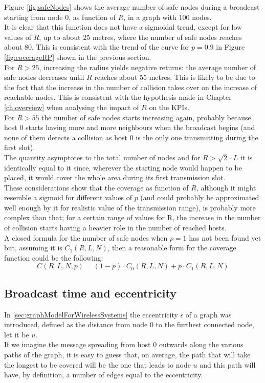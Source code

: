\hfill \break
Figure \ref{fig:safeNodes} shows the average number of safe nodes during a broadcast starting from node 0, as function of $R$, in a graph with 100 nodes.\\
It is clear that this function does not have a sigmoidal trend, except for low values of $R$, up to about 25 metres, where the number of safe nodes reaches about 80. This is consistent with the trend of the curve for $p=0.9$ in Figure \ref{fig:coverageRP} shown in the previous section.\\
For $R > 25$, increasing the radius yields negative returns: the average number of safe nodes decreases until $R$ reaches about 55 metres. This is likely to be due to the fact that the increase in the number of collision takes over on the increase of reachable nodes. This is consistent with the hypothesis made in Chapter \ref{ch:overview} when analysing the impact of $R$ on the KPIs.\\
For $R > 55$ the number of safe nodes starts increasing again, probably because host 0 starts having more and more neighbours when the broadcast begins (and none of them detects a collision as host 0 is the only one transmitting during the first slot).\\ The quantity asymptotes to the total number of nodes and for $R > \sqrt{2}{\cdot}L$ it is identically equal to it since, wherever the starting node would happen to be placed, it would cover the whole area during its first transmission slot.\\
\hfill \break
These considerations show that the coverage as function of $R$, although it might resemble a sigmoid for different values of $p$ (and could probably be approximated well enough by it for realistic value of the transmission range), is probably more complex than that; for a certain range of values for R, the increase in the number of collision starts having a heavier role in the number of reached hosts.\\
A closed formula for the number of safe nodes when $p=1$ has not been found yet but, assuming it is $C_{1}(R, L, N)$, then a reasonable form for the coverage function could be the following:
\begin{equation}\label{eq:coverageClosedForm}
C(R, L, N, p) = (1-p)\cdot C_{0}(R, L, N) + p\cdot C_{1}(R, L, N)
\end{equation}
\pagebreak
\subsection{Broadcast time and eccentricity}\label{ssec:durationVsEccentricity}
In \ref{sec:graphModelForWirelessSystems} the eccentricity $\epsilon$ of a graph was introduced, defined as the distance from node 0 to the furthest connected node, let it be $u$.\\
If we imagine the message spreading from host 0 outwards along the various paths of the graph, it is easy to guess that, on average, the path that will take the longest to be covered will be the one that leads to node $u$ and this path will have, by definition, a number of edges equal to the eccentricity.\\


